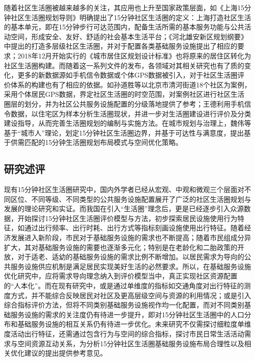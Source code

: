 \documentclass{shnuthesis}
\begin{document}
\indent 随着社区生活圈被越来越多的关注，其应用也上升至国家政策层面，如《上海15分钟社区生活圈规划导则》明确提出了15分钟社区生活圈的定义：上海打造社区生活的基本单元，即在15分钟步行可达范围内，配备生活所需的基本服务功能与公共活动空间，形成安全、友好、舒适的社会基本生活平台；《河北雄安新区规划纲要》中提出的打造多层级社区生活圈，并对于配置各类基础服务设施提出了相应的要求；2018年12月开始实行的《城市居住区规划设计标准》也将原来的居住区转化为社区生活圈构建。而随着这一系列文件的发布，各领域对其相关研究也有了质的变化，更多的新数据源如手机信令数据或个体GPS数据被引入，对于社区生活圈评价体系的构建也有了相应的依据。如孙道胜等以北京市清河街道18个社区为案例，采用个体居民GPS数据，界定社区生活圈的时空范围，对案例社区进行社区生活圈层的划分，并为社区公共服务设施配置的分级落地提供了参考\textsuperscript{\cite{sun2016}}；王德利用手机信令数据，以住宅区为样本分析生活圈现状，并进一步对生活圈建设进行评价及分类建设指导，从而完善生活圈规划的编制与实施方法\textsuperscript{\cite{wang2019b}}。在城市规划与治理上，魏伟等基于“城市人”理论，划定15分钟社区生活圈边界，并基于可达性与满意度，提出基于供需匹配的15分钟生活圈规划布局模式与空间优化策略\textsuperscript{\cite{wei2019}}。

\subsection{研究述评}

现有15分钟社区生活圈研究中，国内外学者已经从宏观、中观和微观三个层面对不同区位、不同等级、不同类型的公共服务设施配置展开了广泛的社区生活圈规划与发展的理论研究和实证。而我国在引入“生活圈”理念后，更是已经逐步引入众源数据，开始探讨15分钟社区生活圈评价模型与方法，初步探索居民设施使用行为特征，如通过出行频率、出行时耗、出行方式等指标刻画设施使用出行特征。随着经济发展进入新阶段，市民对于基础服务设施的需求也不断提高；随着市民组成分异扩大，其对基础服务设施的需要也逐渐多元化；特别是在老龄化和二胎政策的开放，对于适老、适幼的基础服务设施的需求比例不断增加。以居民需求为导向的公共服务设施供应机制是满足居民实现美好生活的必然要求\textsuperscript{\cite{sun2017a}}。所以，在基础服务设施优化研究中，应将需求导向理念纳入到评价模型当中，真正实现社区资源配置的“人本化”。而在现有研究中，或是通过单维度的指标如交通角度对出行特征的测度方式，并不能综合反映居民对社区及更高层级空间与资源的利用情况；或是引入综合指标评价方法，但将不同类别基础服务设施视作均一化配置，而对不同类别基础服务设施的需求的关注度仍有待进一步提升，即对15分钟社区生活圈中的人口分布和基础服务设施的相互关系仍有待进一步优化。未来研究不仅需探讨细粒度单维度活动出行特征，还需通过包含行为与空间的综合指标，探讨市民日常生活活动需求与空间资源互动关系，为分析15分钟社区生活圈基础服务设施布局合理性以及相关优化建议的提出提供参考意见。
\end{document}
